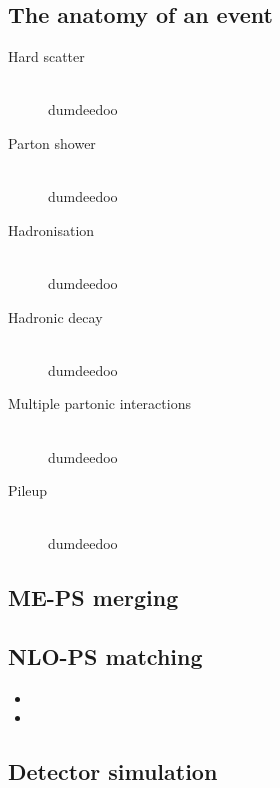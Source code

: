 
\subsection{The anatomy of an event}
\begin{description}
\item[Hard scatter] \hfill \\
	dumdeedoo
\item[Parton shower] \hfill \\
	dumdeedoo
\item[Hadronisation] \hfill \\
	dumdeedoo
\item[Hadronic decay] \hfill \\
	dumdeedoo
\item[Multiple partonic interactions] \hfill \\
	dumdeedoo
\item[Pileup] \hfill \\
	dumdeedoo
\end{description}

\subsection{ME-PS merging}

\subsection{NLO-PS matching}
\begin{itemize}
	\item \mcatnlo
	\item \powheg
\end{itemize}

\subsection{Detector simulation}